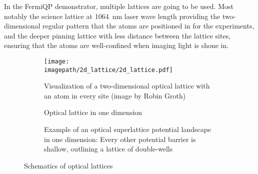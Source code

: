 In the FermiQP demonstrator, multiple lattices are going to be used. Most notably the science lattice at \SI[]{1064}{\nano\meter} laser wave length providing the two-dimensional regular pattern that the atoms are positioned in for the experiments, and the deeper pinning lattice with less distance between the lattice sites, ensuring that the atoms are well-confined when imaging light is shone in.

\begin{figure}
    \centering
    \begin{subfigure}[t]{0.3\textwidth}
        \centering
        \texttt{[image: \\imagepath/2d\_lattice/2d\_lattice.pdf]}
        \caption{Visualization of a two-dimensional optical lattice with an atom in every site (image by Robin Groth)}
        \label{fig:2d_lattice}
    \end{subfigure}
    \hspace{0.03\textwidth}
    \begin{subfigure}[t]{0.3\textwidth}
        \centering
        \caption{Optical lattice in one dimension}
        \label{fig:1d_lattice}
    \end{subfigure}
    \hspace{0.03\textwidth}
    \begin{subfigure}[t]{0.3\textwidth}
        \centering
        \caption{Example of an optical superlattice potential landscape in one dimension: Every other potential barrier is shallow, outlining a lattice of double-wells}
        \label{fig:1d_superlattice}
    \end{subfigure}
    \caption{Schematics of optical lattices}
    \label{fig:lattices}
\end{figure}

